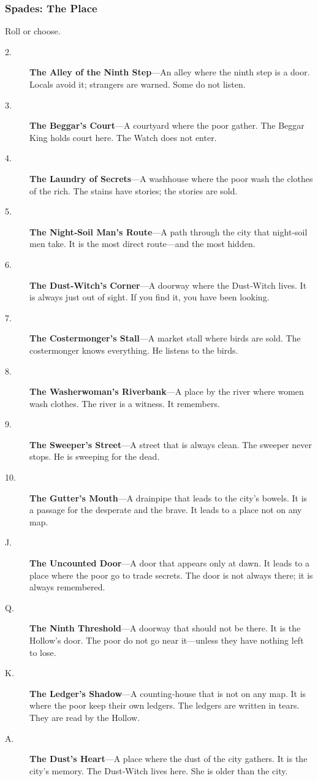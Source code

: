 \documentclass[11pt]{article}
\begin{document}
\subsubsection{Spades: The Place}
Roll or choose.

\begin{description}
\item[2.] \textbf{The Alley of the Ninth Step}—An alley where the ninth step is a door. Locals avoid it; strangers are warned. Some do not listen.
\item[3.] \textbf{The Beggar's Court}—A courtyard where the poor gather. The Beggar King holds court here. The Watch does not enter.
\item[4.] \textbf{The Laundry of Secrets}—A washhouse where the poor wash the clothes of the rich. The stains have stories; the stories are sold.
\item[5.] \textbf{The Night‑Soil Man's Route}—A path through the city that night‑soil men take. It is the most direct route—and the most hidden.
\item[6.] \textbf{The Dust‑Witch's Corner}—A doorway where the Dust‑Witch lives. It is always just out of sight. If you find it, you have been looking.
\item[7.] \textbf{The Costermonger's Stall}—A market stall where birds are sold. The costermonger knows everything. He listens to the birds.
\item[8.] \textbf{The Washerwoman's Riverbank}—A place by the river where women wash clothes. The river is a witness. It remembers.
\item[9.] \textbf{The Sweeper's Street}—A street that is always clean. The sweeper never stops. He is sweeping for the dead.
\item[10.] \textbf{The Gutter's Mouth}—A drainpipe that leads to the city’s bowels. It is a passage for the desperate and the brave. It leads to a place not on any map.
\item[J.] \textbf{The Uncounted Door}—A door that appears only at dawn. It leads to a place where the poor go to trade secrets. The door is not always there; it is always remembered.
\item[Q.] \textbf{The Ninth Threshold}—A doorway that should not be there. It is the Hollow’s door. The poor do not go near it—unless they have nothing left to lose.
\item[K.] \textbf{The Ledger's Shadow}—A counting‑house that is not on any map. It is where the poor keep their own ledgers. The ledgers are written in tears. They are read by the Hollow.
\item[A.] \textbf{The Dust's Heart}—A place where the dust of the city gathers. It is the city’s memory. The Dust‑Witch lives here. She is older than the city.
\end{description}
\end{document}
